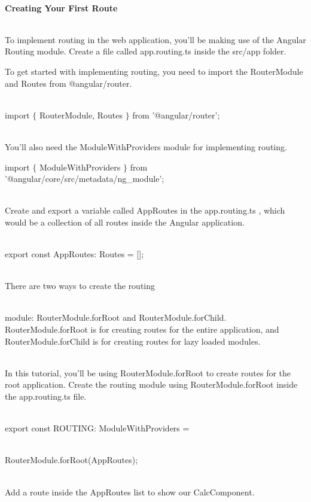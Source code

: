 \documentclass{article}
\begin{document}
\noindent 

\noindent \\ \textbf{Creating Your First Route}

\noindent \\ To implement routing in the web application, you'll be making use of the Angular Routing module. Create a file called app.routing.ts inside the src/app folder.

\noindent To get started with implementing routing, you need to import the RouterModule and Routes from @angular/router.

\noindent 

\noindent \\ import $\mathrm{\{}$ RouterModule, Routes $\mathrm{\}}$ from '@angular/router';

\noindent  

\noindent \\ You'll also need the ModuleWithProviders module for implementing routing.

\noindent import $\mathrm{\{}$ ModuleWithProviders $\mathrm{\}}$ from '@angular/core/src/metadata/ng\_module';

\noindent \\ Create and export a variable called AppRoutes in the app.routing.ts , which would be a collection of all routes inside the Angular application.

\noindent \\ export const AppRoutes: Routes = [];

\noindent \\ There are two ways to create the routing

\noindent \\ module:  RouterModule.forRoot  and  RouterModule.forChild. RouterModule.forRoot is for creating routes for the entire application, and RouterModule.forChild is for creating routes for lazy loaded modules.

\noindent \\ In this tutorial, you'll be using RouterModule.forRoot to create routes for the root application. Create the routing module using RouterModule.forRoot inside the app.routing.ts file.

\noindent \\ export const ROUTING: ModuleWithProviders =

\noindent \\ RouterModule.forRoot(AppRoutes);

\noindent \\ Add a route inside the AppRoutes list to show our CalcComponent.
\end{document}
